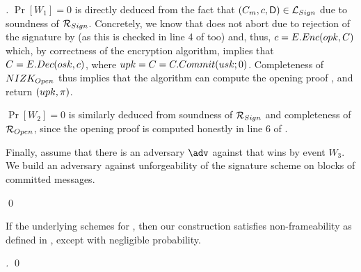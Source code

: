 \begin{proof}[]
  $\Pr[W_1]=0$ is directly deduced from the fact that $(C_m,c,\mathsf{D})
  \in \mathcal{L}_{Sign}$ due to soundness of $\mathcal{R}_{Sign}$. Concretely,
  we know that \Open does not abort due to rejection of the signature by
  \Verify (as this is checked in line 4 of \ExpGSACTrace too) and, thus,
  $c = E.Enc(opk,C)$ which, by correctness of the encryption algorithm,
  implies that $C = E.Dec(osk,c)$, where $upk=C=C.Commit(usk;0)$.
  Completeness of $NIZK_{Open}$ thus implies that the \Open algorithm can
  compute the opening proof \oproof, and return $(upk,\pi)$.
  
  $\Pr[W_2] = 0$ is similarly deduced from soundness of $\mathcal{R}_{Sign}$ and
  completeness of $\mathcal{R}_{Open}$, since the opening proof is computed
  honestly in line 6 of \ExpGSACTrace.

  Finally, assume that there is an adversary $\adv$ against \ExpNonTrace that
  wins by event $W_3$. We build an adversary against unforgeability of the
  signature scheme on blocks of committed messages.
  
  \qed
\end{proof}

\begin{theorem}
  \label{thm:frame-gsac}
  If the underlying schemes for , then our \GSACGen construction
  satisfies non-frameability as defined in , except with
  negligible probability.
\end{theorem}

\begin{proof}[]
  \qed
\end{proof}

